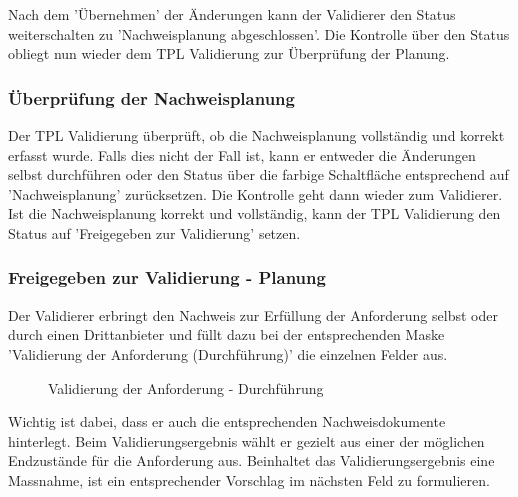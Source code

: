 Nach dem 'Übernehmen' der Änderungen kann der Validierer den Status weiterschalten zu 'Nachweisplanung abgeschlossen'. Die Kontrolle über den Status obliegt nun wieder dem TPL Validierung zur Überprüfung der Planung. 

\subsubsection{Überprüfung der Nachweisplanung}

Der TPL Validierung überprüft, ob die Nachweisplanung vollständig und korrekt erfasst wurde. Falls dies nicht der Fall ist, kann er entweder die Änderungen selbst durchführen oder den Status über die farbige Schaltfläche entsprechend auf 'Nachweisplanung' zurücksetzen. Die Kontrolle geht dann wieder zum Validierer. Ist die Nachweisplanung korrekt und vollständig, kann der TPL Validierung den Status auf 'Freigegeben zur Validierung' setzen. 

\subsubsection{Freigegeben zur Validierung - Planung}

Der Validierer erbringt den Nachweis zur Erfüllung der Anforderung selbst oder durch einen Drittanbieter und füllt dazu bei der entsprechenden Maske 'Validierung der Anforderung (Durchführung)' die einzelnen Felder aus. 

\begin{figure}[H]
\caption{Validierung der Anforderung - Durchführung}
\end{figure}

Wichtig ist dabei, dass er auch die entsprechenden Nachweisdokumente hinterlegt. Beim Validierungsergebnis wählt er gezielt aus einer der möglichen Endzustände für die Anforderung aus. Beinhaltet das Validierungsergebnis eine Massnahme, ist ein entsprechender Vorschlag im nächsten Feld zu formulieren. \\
 
